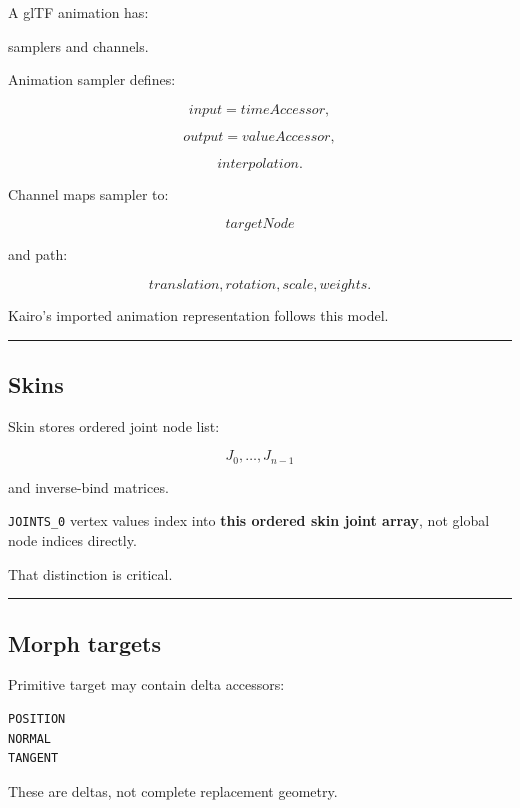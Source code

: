 A glTF animation has:

samplers and channels.

Animation sampler defines:

\[
input=timeAccessor,
\]

\[
output=valueAccessor,
\]

\[
interpolation.
\]

Channel maps sampler to:

\[
targetNode
\]

and path:

\[
translation,
rotation,
scale,
weights.
\]

Kairo's imported animation representation follows this model.

\begin{center}\rule{0.5\linewidth}{0.5pt}\end{center}

\subsection{Skins}\label{04-visual-computing-ii-ch041-skins}

\hypertarget{04-visual-computing-ii-ch041-skins}{}

Skin stores ordered joint node list:

\[
J_0,\dots,J_{n-1}
\]

and inverse-bind matrices.

\texttt{JOINTS\_0} vertex values index into \textbf{this ordered skin joint array}, not global node indices directly.

That distinction is critical.

\begin{center}\rule{0.5\linewidth}{0.5pt}\end{center}

\subsection{Morph targets}\label{04-visual-computing-ii-ch041-morph-targets}

\hypertarget{04-visual-computing-ii-ch041-morph-targets}{}

Primitive target may contain delta accessors:

\begin{verbatim}
POSITION
NORMAL
TANGENT
\end{verbatim}

These are deltas, not complete replacement geometry.

